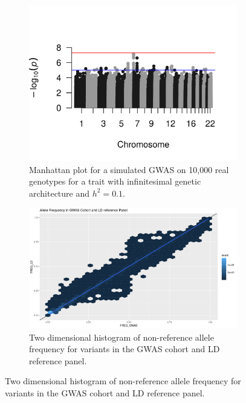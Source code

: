 \begin{figure}
  \centering
  \begin{subfigure}[t]{\textwidth}
    \centering
    \includegraphics[width=\linewidth]{img/rssp_01.png}
    \caption{Manhattan plot for a simulated GWAS on 10,000 real genotypes for a trait with infinitesimal genetic architecture and $h^2=0.1$.  }\label{fig:gwas_01}
  \end{subfigure}
    \begin{subfigure}[t]{\textwidth}
    \centering
    \includegraphics[width=\linewidth]{img/Allele_freq_match.png}
    \caption{Two dimensional histogram of non-reference allele frequency for variants in the GWAS cohort and LD reference panel.}\label{fig:gwas_01}
  \end{subfigure}
\end{figure}



